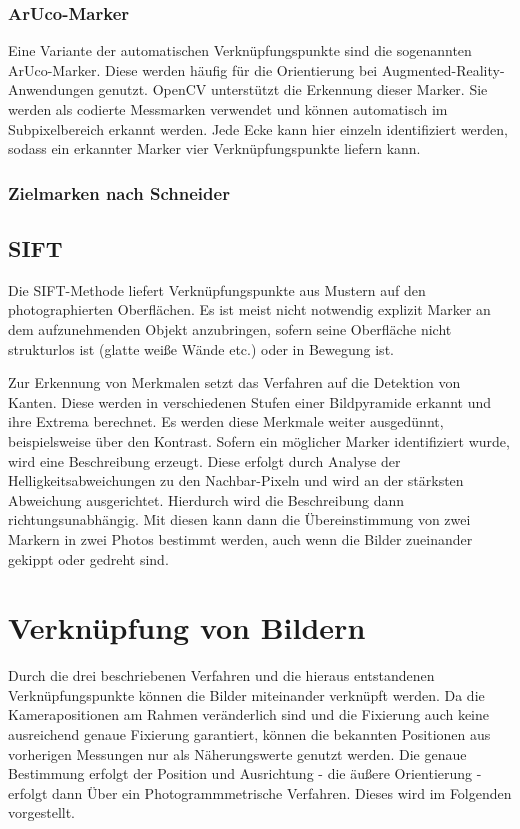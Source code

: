 \documentclass[./00PhotoBox.tex]{subfiles}
\begin{document}
\subsubsection{ArUco-Marker}
Eine Variante der automatischen Verknüpfungspunkte sind die sogenannten ArUco-Marker. Diese werden häufig für die Orientierung bei Augmented-Reality-Anwend\-ungen genutzt. OpenCV unterstützt die Erkennung dieser Marker. Sie werden als codierte Messmarken verwendet und können automatisch im Subpixelbereich erkannt werden. Jede Ecke kann hier einzeln identifiziert werden, sodass ein erkannter Marker vier Verknüpfungspunkte liefern kann.

\subsubsection{Zielmarken nach Schneider}
\citep[S. 541]{luhmann}

\subsection{SIFT}
Die SIFT-Methode liefert Verknüpfungspunkte aus Mustern auf den photographierten Oberflächen. Es ist meist nicht notwendig explizit Marker an dem aufzunehmenden Objekt anzubringen, sofern seine Oberfläche nicht strukturlos ist (glatte weiße Wände etc.) oder in Bewegung ist.

Zur Erkennung von Merkmalen setzt das Verfahren auf die Detektion von Kanten. Diese werden in verschiedenen Stufen einer Bildpyramide erkannt und ihre Extrema berechnet. Es werden diese Merkmale weiter ausgedünnt, beispielsweise über den Kontrast. Sofern ein möglicher Marker identifiziert wurde, wird eine Beschreibung erzeugt. Diese erfolgt  durch Analyse der Helligkeitsabweichungen zu den Nachbar-Pixeln und wird an der stärksten Abweichung ausgerichtet. Hierdurch wird die Beschreibung dann richtungsunabhängig. Mit diesen kann dann die Übereinstimmung von zwei Markern in zwei Photos bestimmt werden, auch wenn die Bilder zueinander gekippt oder gedreht sind.
\citep[S. 484f]{luhmann}

\section{Verknüpfung von Bildern}
\label{s:photogramm}
Durch die drei beschriebenen Verfahren und die hieraus entstandenen Verknüpfungs\-punkte können die Bilder miteinander verknüpft werden. Da die Kamerapositionen am Rahmen veränderlich sind und die Fixierung auch keine ausreichend genaue Fixierung garantiert, können die bekannten Positionen aus vorherigen Messungen nur als Näherungswerte genutzt werden. Die genaue Bestimmung erfolgt der Position und Ausrichtung - die äußere Orientierung - erfolgt dann Über ein Photogrammmetrische Verfahren. Dieses wird im Folgenden vorgestellt.
\end{document}
